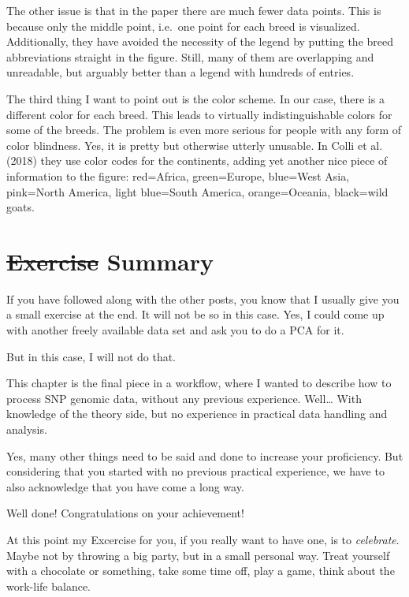 \documentclass[]{book}
\begin{document}
The other issue is that in the paper there are much fewer data points.
This is because only the middle point, i.e.~one point for each breed is
visualized. Additionally, they have avoided the necessity of the legend
by putting the breed abbreviations straight in the figure. Still, many
of them are overlapping and unreadable, but arguably better than a
legend with hundreds of entries.

The third thing I want to point out is the color scheme. In our case,
there is a different color for each breed. This leads to virtually
indistinguishable colors for some of the breeds. The problem is even
more serious for people with any form of color blindness. Yes, it is
pretty but otherwise utterly unusable. In Colli et al. (2018) they use
color codes for the continents, adding yet another nice piece of
information to the figure: red=Africa, green=Europe, blue=West Asia,
pink=North America, light blue=South America, orange=Oceania, black=wild
goats.

\section{\texorpdfstring{\sout{Exercise}
Summary}{Exercise Summary}}\label{exercise-summary}

If you have followed along with the other posts, you know that I usually
give you a small exercise at the end. It will not be so in this case.
Yes, I could come up with another freely available data set and ask you
to do a PCA for it.

But in this case, I will not do that.

This chapter is the final piece in a workflow, where I wanted to
describe how to process SNP genomic data, without any previous
experience. Well\ldots{} With knowledge of the theory side, but no
experience in practical data handling and analysis.

Yes, many other things need to be said and done to increase your
proficiency. But considering that you started with no previous practical
experience, we have to also acknowledge that you have come a long way.

Well done! Congratulations on your achievement!

At this point my Excercise for you, if you really want to have one, is
to \emph{celebrate}. Maybe not by throwing a big party, but in a small
personal way. Treat yourself with a chocolate or something, take some
time off, play a game, think about the work-life balance.
\end{document}
